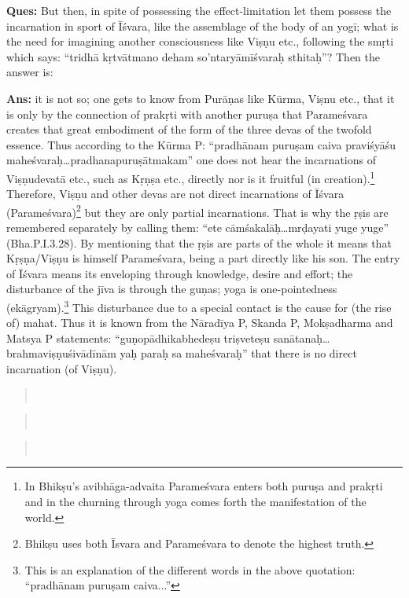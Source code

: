 \textbf{Ques:}  But then, in spite of possessing the effect-limitation let them possess the incarnation in sport of Īśvara, like the assemblage of the body of an yogī; what is the need for imagining another consciousness like Viṣṇu etc., following the smṛti which says: “tridhā kṛtvātmano deham so’ntaryāmīśvaraḥ sthitaḥ”? Then the answer is: 

\textbf{Ans:} it is not so; one gets to know from Purāṇas like Kūrma, Viṣnu etc., that it is only by the connection of prakṛti with another puruṣa that Parameśvara creates that great embodiment of the form of the three devas of the twofold essence. Thus according to the Kūrma P: “pradhānam puruṣam caiva praviśyāśu maheśvaraḥ…pradhanapuruṣātmakam” one does not hear the incarnations of Viṣṇudevatā etc., such as Kṛṇṣa etc., directly nor is it fruitful (in creation).\footnote{In Bhikṣu’s avibhāga-advaita Parameśvara enters both puruṣa and prakṛti and in the churning through yoga comes forth the manifestation of the world.} Therefore, Viṣṇu and other devas are not direct incarnations of Īśvara (Parameśvara)\footnote{Bhikṣu uses both Īsvara and Parameśvara to denote the highest truth.} but they are only partial incarnations. That is why the ṛṣis are remembered separately by calling them: “ete cāmśakalāḥ…mrḍayati yuge yuge” (Bha.P.I.3.28). By mentioning that the ṛṣis are parts of the whole it means that Kṛṣṇa/Viṣṇu is himself Parameśvara, being a part directly like his son. The entry of Īśvara means its enveloping through knowledge, desire and effort;   the disturbance of the jīva is through the guṇas; yoga is one-pointedness (ekāgryam).\footnote{This is an explanation of the different words in the above quotation: “pradhānam puruṣam caiva...”} This disturbance due to a special contact is the cause for (the rise of) mahat. Thus it is known from the Nāradīya P, Skanda P, Mokṣadharma and Matsya P statements: “guṇopādhikabhedeṣu triṣveteṣu sanātanaḥ…brahmaviṣṇuśivādīnām yaḥ paraḥ sa maheśvaraḥ” that there is no direct incarnation (of Viṣṇu).

\begin{verse}
\\
\end{verse}
\begin{verse}
\\
\end{verse}
\begin{verse}
\\
\end{verse}

